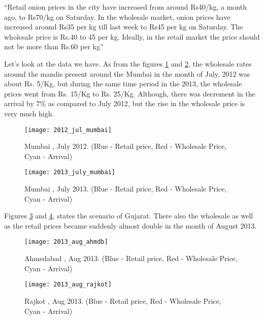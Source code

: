 “Retail onion prices in the city have increased from around Rs40/kg, a month ago, to Rs70/kg on Saturday. In the wholesale market, onion prices have increased around Rs35 per kg till last week to Rs45 per kg on Saturday. The wholesale price is Rs.40 to 45 per kg. Ideally, in the retail market the price should not be more than Rs.60 per kg”

Let's look at the data we have. As from the figures \ref{fig:MumbaiJuly2012} and \ref{fig:MumbaiJuly2013}, the wholesale rates around the mandis present around the Mumbai in the month of July, 2012 was about Rs. 5/Kg, but during the same time period in the 2013, the wholesale prices went from Rs. 15/Kg to Rs. 25/Kg. Although, there was decrement in the arrival by 7\% as compared to July 2012, but the rise in the wholesale price is very much high.

\begin{figure}[here]
\begin{center}	
\texttt{[image: 2012\_jul\_mumbai]} 
\caption{Mumbai , July 2012. (Blue - Retail price, Red - Wholesale Price, Cyan - Arrival)}
\label{fig:MumbaiJuly2012}
\end{center}
\end{figure}

\begin{figure}[here]
\begin{center}	
\texttt{[image: 2013\_july\_mumbai]} 
\caption{Mumbai , July 2013. (Blue - Retail price, Red - Wholesale Price, Cyan - Arrival)}
\label{fig:MumbaiJuly2013}
\end{center}
\end{figure}


Figures \ref{fig:AhmedabadAug2013} and \ref{fig:RajkotAug2013}, states the scenario of Gujarat. There also the wholesale as well as the retail prices became suddenly almost double in the month of August 2013.

\begin{figure}[here]
\begin{center}	
\texttt{[image: 2013\_aug\_ahmdb]} 
\caption{Ahmedabad , Aug 2013. (Blue - Retail price, Red - Wholesale Price, Cyan - Arrival)}
\label{fig:AhmedabadAug2013}
\end{center}
\end{figure}

\begin{figure}[here]
\begin{center}	
\texttt{[image: 2013\_aug\_rajkot]} 
\caption{Rajkot , Aug 2013. (Blue - Retail price, Red - Wholesale Price, Cyan - Arrival)}
\label{fig:RajkotAug2013}
\end{center}
\end{figure}


